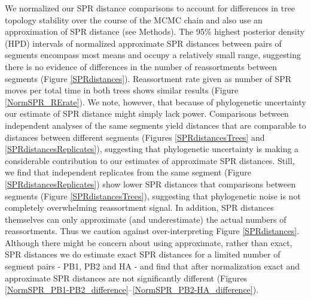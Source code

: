 \documentclass[11pt,oneside,letterpaper]{article}
\begin{document}
We normalized our SPR distance comparisons to account for differences in tree topology stability over the course of the MCMC chain and also use an approximation of SPR distance \cite{whidden2009,whidden2010,whidden2013} (see Methods).
The 95\% highest posterior density (HPD) intervals of normalized approximate SPR distances between pairs of segments encompass most means and occupy a relatively small range, suggesting there is no evidence of differences in the number of reassortments between segments (Figure \ref{SPRdistances}).
Reassortment rate given as number of SPR moves per total time in both trees shows similar results (Figure \ref{NormSPR_RErate}).
We note, however, that because of phylogenetic uncertainty our estimate of SPR distance might simply lack power.
Comparisons between independent analyses of the same segments yield distances that are comparable to distances between different segments (Figures \ref{SPRdistancesTrees} and \ref{SPRdistancesReplicates}), suggesting that phylogenetic uncertainty is making a considerable contribution to our estimates of approximate SPR distances.
Still, we find that independent replicates from the same segment (Figure \ref{SPRdistancesReplicates}) show lower SPR distances that comparisons between segments (Figure \ref{SPRdistancesTrees}), suggesting that phylogenetic noise is not completely overwhelming reassortment signal.
In addition, SPR distances themselves can only approximate (and underestimate) the actual numbers of reassortments.
Thus we caution against over-interpreting Figure \ref{SPRdistances}.
Although there might be concern about using approximate, rather than exact, SPR distances we do estimate exact SPR distances for a limited number of segment pairs - PB1, PB2 and HA - and find that after normalization exact and approximate SPR distances are not significantly different (Figures \ref{NormSPR_PB1-PB2_difference}--\ref{NormSPR_PB2-HA_difference}).
\end{document}
